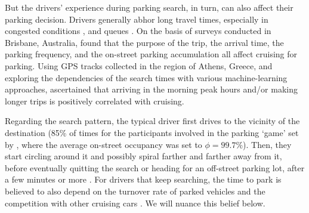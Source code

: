 \documentclass[trsc,reprint]{informs3}
\newcommand{\AN}[1]{#1}
\begin{document}
But \AN{the drivers'} experience during parking search, in turn, can also affect their parking decision. 
\AN{Drivers generally abhor} long travel times, especially in congested conditions \citep{gao2021smartphone}, and queues \citep{tanaka2017analysis}. 
\AN{On the basis of surveys conducted in Brisbane, Australia, \citet{assemi2020searching} found that the purpose of the trip, the arrival time, the parking frequency, and the on-street parking accumulation all affect cruising for parking.
Using GPS tracks collected in the region of Athens, Greece, and exploring the dependencies of the search times with various
machine-learning approaches, \citet{mantouka2021deep} ascertained that  arriving in the morning peak hours and/or making longer trips 
is positively correlated with cruising.
}
\AN{Regarding the search pattern, the} typical driver first drives to the vicinity of the destination (85\% of times \AN{for the participants involved in the parking `game' set by} \citep{fulman2020modeling}, 
where the average on-street occupancy was set to $\phi=99.7\%$). Then, they start circling around it and possibly spiral farther and farther away from it, before eventually quitting the search or heading for an off-street parking lot, after a few minutes \citep{fulman2020modeling} or more \citep{SARECO2005,levy2013exploring,weinberger2020parking,fulman2021approximation,Cerema2015EMD}.
For drivers that keep searching, the time to park is believed to also depend on the
turnover rate of parked vehicles \citep{SARECO2005} and the competition with other cruising cars  \citep{SARECO2005,arnott2017cruising}. \AN{We will nuance this belief below.}
\end{document}
